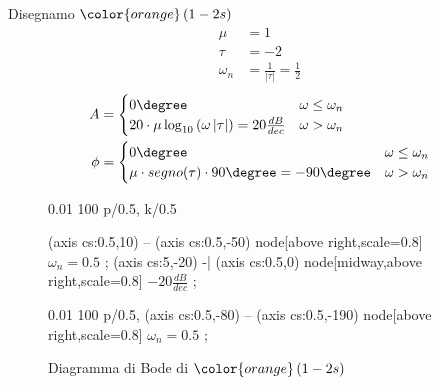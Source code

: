 \documentclass[a4paper]{article}
\begin{document}
\begin{example}
    \vspace{1em}
    \noindent
    Disegnamo \( \color{orange} \left( 1 - 2s \right)  \)
    \[
    \begin{aligned}
      \mu &= 1\\
      \tau &= -2\\
      \omega_n &= \frac{1}{|\tau|} = \frac{1}{2}
    \end{aligned}
    \] 
    \[
    \begin{aligned}
      A &= \begin{cases}
        0\degree & \omega \le \omega_n\\
        20 \cdot \mu \log_{10} \left( \omega \left| \tau \right|  \right) = 20 \frac{dB}{dec} & \omega > \omega_n
      \end{cases}\\
        \phi &= \begin{cases}
          0\degree & \omega \le \omega_n\\
          \mu \cdot segno(\tau) \cdot 90\degree = -90\degree & \omega > \omega_n
        \end{cases}
    \end{aligned}
    \] 
    \begin{figure}[H]
      \centering
      \begin{BodeMagPlot}[scale=1.5,ytick distance=20,ylabel={Ampiezza (dB)},xlabel={}] {0.01} {100}
        {
          p/{0.5},
          k/0.5
        }

         (axis cs:0.5,10) -- (axis cs:0.5,-50) node[above right,scale=0.8] {\( \omega_n = 0.5 \) };
         (axis cs:5,-20) -| (axis cs:0.5,0) 
        node[midway,above right,scale=0.8] {\( -20 \frac{dB}{dec} \) };
      \end{BodeMagPlot}

      \begin{BodePhPlot}[
        scale=1.5,ytick distance=90,ylabel={Fase (deg)},xlabel={Frequenza (rad/s)},
        ] {0.01} {100}
        {
          p/{0.5},
        }
         (axis cs:0.5,-80) -- (axis cs:0.5,-190) node[above right,scale=0.8] {\( \omega_n = 0.5 \) };
      \end{BodePhPlot}
      \caption{Diagramma di Bode di \( \color{orange} \left( 1 - 2s \right)  \)}
    \end{figure}
\end{example}
\end{document}
